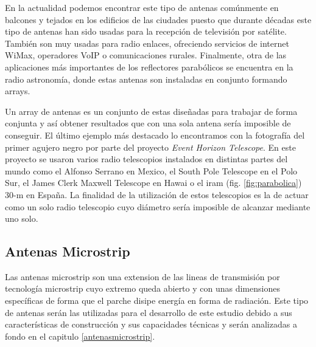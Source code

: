 \par En la actualidad podemos encontrar este tipo de antenas comúnmente en balcones y tejados en los edificios de las ciudades puesto que durante décadas este tipo de antenas han sido usadas para la recepción de televisión por satélite. También son muy usadas para radio enlaces, ofreciendo servicios de internet WiMax, operadores VoIP o comunicaciones rurales. Finalmente, otra de las aplicaciones más importantes de los reflectores parabólicos se encuentra en la radio astronomía, donde estas antenas son instaladas en conjunto formando arrays. 
\\
\par Un array de antenas es un conjunto de estas diseñadas para trabajar de forma conjunta y así obtener resultados que con una sola antena sería imposible de conseguir. El último ejemplo más destacado lo encontramos con la fotografía del primer agujero negro por parte del proyecto \textit{Event Horizon Telescope}. En este proyecto se usaron varios radio telescopios instalados en distintas partes del mundo como el Alfonso Serrano en Mexico, el South Pole Telescope en el Polo Sur, el James Clerk Maxwell Telescope en Hawai o el \gls{iram} (fig. \ref{fig:parabolica}) 30-m en España. La finalidad de la utilización de estos telescopios es la de actuar como un solo radio telescopio cuyo diámetro sería imposible de alcanzar mediante uno solo.

\subsection{Antenas Microstrip}

\par Las antenas microstrip son una extension de las lineas de transmisión por tecnología microstrip cuyo extremo queda abierto y con unas dimensiones específicas de forma que el parche disipe energía en forma de radiación. Este tipo de antenas serán las utilizadas para el desarrollo de este estudio debido a sus características de construcción y sus capacidades técnicas y serán analizadas a fondo en el capitulo \ref{antenasmicrostrip}.
\vfill

